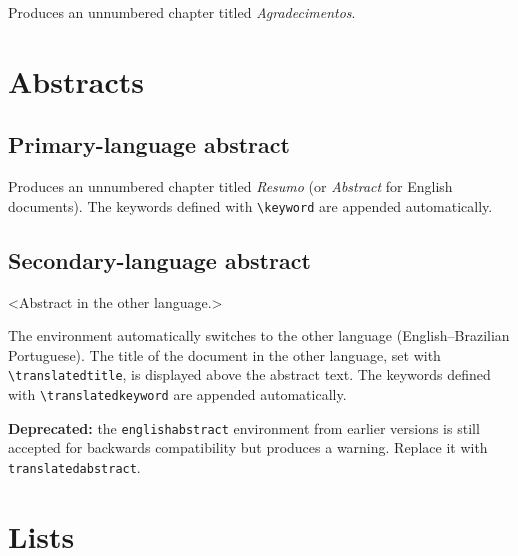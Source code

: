 \documentclass[11pt,a4paper]{article}
\newcommand{\cmd}[1]{\texttt{\textbackslash #1}}
\newcommand{\env}[1]{\texttt{#1}}
\begin{document}
Produces an unnumbered chapter titled \textit{Agradecimentos}.

\section{Abstracts}
\label{sec:abstracts}

\subsection{Primary-language abstract}

\begin{latex}
\begin{abstract}
  <Abstract text.>
\end{abstract}
\end{latex}

Produces an unnumbered chapter titled \textit{Resumo} (or
\textit{Abstract} for English documents).  The keywords defined with
\cmd{keyword} are appended automatically.

\subsection{Secondary-language abstract}

\begin{latex}
\begin{translatedabstract}
  <Abstract in the other language.>
\end{translatedabstract}
\end{latex}

The environment automatically switches to the other language
(English--Brazilian Portuguese).  The title of the document in the
other language, set with \cmd{translatedtitle}, is displayed above
the abstract text.  The keywords defined with \cmd{translatedkeyword}
are appended automatically.

\bigskip
\noindent\textbf{Deprecated:} the \env{englishabstract} environment
from earlier versions is still accepted for backwards compatibility
but produces a warning.  Replace it with \env{translatedabstract}.

\section{Lists}
\label{sec:lists}
\end{document}
